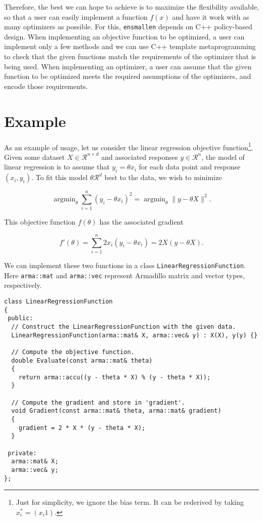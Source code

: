 \documentclass{article}
\begin{document}
Therefore, the best we can hope to achieve is to maximize the flexibility
available, so that a user can easily implement a function $f(x)$ and have it
work with as many optimizers as possible.  For this, {\tt ensmallen} depends on
C++ policy-based design.  When implementing an objective function to be
optimized, a user can implement only a few methods and we can use C++ template
metaprogramming to check that the given functions match the requirements of the
optimizer that is being used.  When implementing an optimizer, a user can assume
that the given function to be optimized meets the required assumptions of the
optimizers, and encode those requirements.

\section{Example}

As an example of usage, let us consider the linear regression objective
function\footnote{Just for simplicity, we ignore the bias term.  It can be
rederived by taking $x^*_i = (x_i 1)$.}.  Given some dataset $X \in
\mathcal{R}^{n \times d}$ and associated responses $y \in \mathcal{R}^n$, the
model of linear regression is to assume that $y_i = \theta x_i$ for each data
point and response $(x_i, y_i)$.  To fit this model $\theta \mathcal{R}^d$ best
to the data, we wish to minimize

\begin{equation}
\operatorname{argmin}_\theta \sum_{i = 1}^n (y_i - \theta x_i)^2 =
\operatorname{argmin}_\theta \| y - \theta X \|^2.
\end{equation}

This objective function $f(\theta)$ has the associated gradient

\begin{equation}
f'(\theta) = \sum_{i = 1}^n 2 x_i (y_i - \theta x_i) = 2 X (y - \theta X).
\end{equation}

We can implement these two functions in a class {\tt LinearRegressionFunction}.
Here {\tt arma::mat} and {\tt arma::vec} represent Armadillo matrix and vector
types, respectively. %

\begin{verbatim}
class LinearRegressionFunction
{
 public:
  // Construct the LinearRegressionFunction with the given data.
  LinearRegressionFunction(arma::mat& X, arma::vec& y) : X(X), y(y) {}

  // Compute the objective function.
  double Evaluate(const arma::mat& theta)
  {
    return arma::accu((y - theta * X) % (y - theta * X));
  }

  // Compute the gradient and store in 'gradient'.
  void Gradient(const arma::mat& theta, arma::mat& gradient)
  {
    gradient = 2 * X * (y - theta * X);
  }

 private:
  arma::mat& X;
  arma::vec& y;
};
\end{verbatim}
\end{document}
